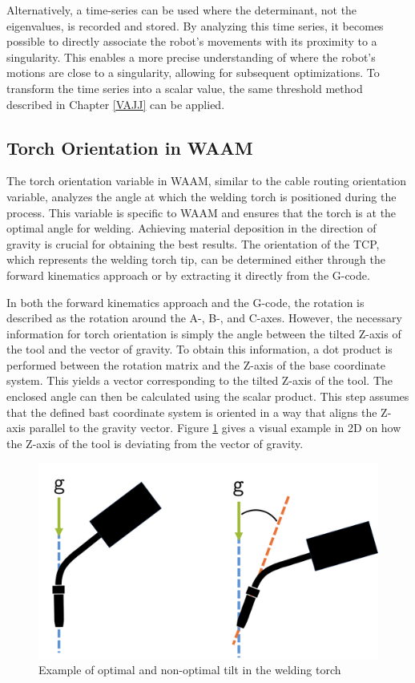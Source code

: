 Alternatively, a time-series can be used where the determinant, not the eigenvalues, is recorded and stored. By analyzing this time series, it becomes possible to directly associate the robot's movements with its proximity to a singularity. This enables a more precise understanding of where the robot's motions are close to a singularity, allowing for subsequent optimizations. To transform the time series into a scalar value, the same threshold method described in Chapter \ref{VAJJ} can be applied.
  
  

\subsection{Torch Orientation in WAAM}
The torch orientation variable in \acrshort{WAAM}, similar to the cable routing orientation variable, analyzes the angle at which the welding torch is positioned during the process. This variable is specific to \acrshort{WAAM} and ensures that the torch is at the optimal angle for welding. Achieving material deposition in the direction of gravity is crucial for obtaining the best results. The orientation of the \acrshort{TCP}, which represents the welding torch tip, can be determined either through the forward kinematics approach or by extracting it directly from the G-code.

In both the forward kinematics approach and the G-code, the rotation is described as the rotation  around the A-, B-, and C-axes. However, the necessary information for torch orientation is simply the angle between the tilted Z-axis of the tool and the vector of gravity. To obtain this information, a dot product is performed between the rotation matrix and the Z-axis of the base coordinate system. This yields a vector corresponding to the tilted Z-axis of the tool. The enclosed angle can then be calculated using the scalar product. This step assumes that the defined bast coordinate system is oriented in a way that aligns the Z-axis parallel to the gravity vector. Figure \ref{tilt} gives a visual example in 2D on how the Z-axis of the tool is deviating from the vector of gravity.

\begin{figure}[H]
	\centerline{\includegraphics[width=.45\textwidth]{figures/ttilt.png}}
	\caption{Example of optimal and non-optimal tilt in the welding torch}
	\label{tilt}
\end{figure}

